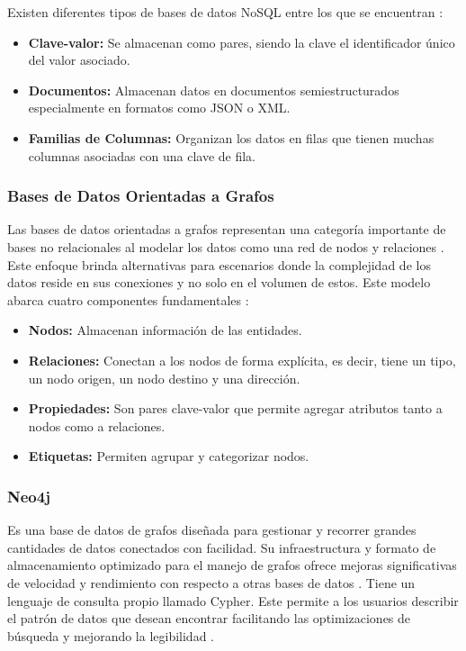 Existen diferentes tipos de bases de datos NoSQL entre los que se encuentran \cite{sadalage2013nosql}:
\begin{itemize}
    \item \textbf{Clave-valor:} Se almacenan como pares, siendo la clave el identificador único del valor asociado.
    \item \textbf{Documentos:} Almacenan datos en documentos semiestructurados especialmente en formatos como JSON o XML.
    \item \textbf{Familias de Columnas:} Organizan los datos en filas que tienen muchas columnas asociadas con una clave de fila.
\end{itemize}

\subsubsection{Bases de Datos Orientadas a Grafos}
Las bases de datos orientadas a grafos representan una categoría importante de bases no relacionales al modelar los datos como una red de nodos y relaciones \cite{lal2015neo4j}.
Este enfoque brinda alternativas para escenarios donde la complejidad de los datos reside en sus conexiones y no solo en el volumen de estos. Este modelo abarca cuatro componentes fundamentales \cite{vukotic2014neo4j}:
\begin{itemize}
    \item \textbf{Nodos:} Almacenan información de las entidades.
    \item \textbf{Relaciones:} Conectan a los nodos de forma explícita, es decir, tiene un tipo, un nodo origen, un nodo destino y una dirección.
    \item \textbf{Propiedades:} Son pares clave-valor que permite agregar atributos tanto a nodos como a relaciones.
    \item \textbf{Etiquetas:} Permiten agrupar y categorizar nodos.
\end{itemize}

\subsubsection{Neo4j}
Es una base de datos de grafos diseñada para gestionar y recorrer grandes cantidades de datos conectados con facilidad. Su infraestructura y formato de almacenamiento optimizado para el manejo de grafos ofrece mejoras significativas de velocidad y rendimiento con respecto a otras bases de datos \cite{van2014learning}.
Tiene un lenguaje de consulta propio llamado Cypher. Este permite a los usuarios describir el patrón de datos que desean encontrar facilitando las optimizaciones de búsqueda y mejorando la legibilidad \cite{baton2017learning}. 

